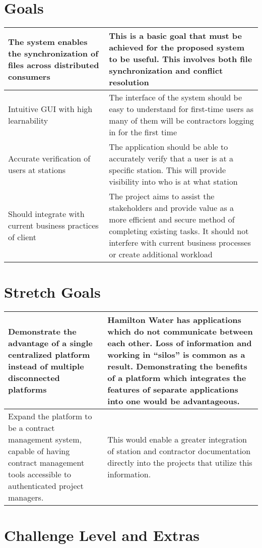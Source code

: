 \documentclass{article}
\begin{document}
\section{Goals}
\begin{longtable}{|m{5cm}|m{8cm}|}
\hline
The system enables the synchronization of files across distributed consumers & 
This is a basic goal that must be achieved for the proposed system to be
useful. This involves both file synchronization and conflict resolution\\
\hline
Intuitive GUI with high learnability & The interface of the system should be easy to understand for first-time users
as many of them will be contractors logging in for the first time\\
\hline
Accurate verification of users at stations & The application should be able to accurately verify that a user is at a specific
station. This will provide visibility into who is at what station\\
\hline
Should integrate with current business practices of client & The project aims to assist the stakeholders and 
provide value as a more efficient and secure method of completing existing tasks.
It should not interfere with current business processes or create additional workload\\
\hline
\end{longtable}
\section{Stretch Goals}

\begin{longtable}{|m{5cm}|m{8cm}|}
\hline
Demonstrate the advantage of a
single centralized platform instead
of multiple disconnected platforms & Hamilton Water has applications which do not communicate
between each other. Loss of information and working in “silos” is
common as a result. Demonstrating the benefits of a platform
which integrates the features of separate applications into one
would be advantageous.\\
\hline
Expand the platform to be a contract management system,
capable of having contract management tools accessible to authenticated project managers. &
This would enable a greater integration of station and contractor
documentation directly into the projects that utilize this information.\\
\hline
\end{longtable}

\section{Challenge Level and Extras}
\end{document}
